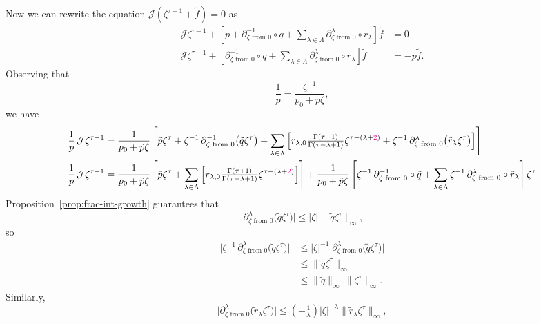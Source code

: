 \documentclass{article}
\theoremstyle{plain}
\begin{document}
Now we can rewrite the equation $\mathcal{J}(\zeta^{\tau-1} + \tilde{f}) = 0$ as
\begin{align*}
\mathcal{J} \zeta^{\tau-1} + \left[ p + \partial^{-1}_{\zeta \text{ from } 0} \circ q + \sum_{\lambda \in \Lambda} \partial^\lambda_{\zeta \text{ from } 0} \circ r_\lambda \right] \tilde{f} & = 0 \\
\mathcal{J} \zeta^{\tau-1} + \left[ \partial^{-1}_{\zeta \text{ from } 0} \circ q + \sum_{\lambda \in \Lambda} \partial^\lambda_{\zeta \text{ from } 0} \circ r_\lambda \right] \tilde{f} & = -p\tilde{f}.
\end{align*}
Observing that
\[ \frac{1}{p} = \frac{\zeta^{-1}}{p_0 + \tilde{p} \zeta}, \]
we have
\begin{align*}
\frac{1}{p}\,\mathcal{J} \zeta^{\tau-1} & = \frac{1}{p_0 + \tilde{p} \zeta} \left[ \tilde{p} \zeta^\tau + \zeta^{-1}\,\partial^{-1}_{\zeta \text{ from } 0}\big(\tilde{q} \zeta^\tau\big) + \sum_{\lambda \in \Lambda} \left[ r_{\lambda,0} \tfrac{\Gamma(\tau+1)}{\Gamma(\tau-\lambda+1)} \zeta^{\tau-(\lambda+\textcolor{magenta}{2})} + \zeta^{-1}\,\partial^\lambda_{\zeta \text{ from } 0} \big(\tilde{r}_\lambda \zeta^\tau\big) \right] \right] \\
\frac{1}{p}\,\mathcal{J} \zeta^{\tau-1} & = \frac{1}{p_0 + \tilde{p} \zeta} \left[ \tilde{p} \zeta^\tau + \sum_{\lambda \in \Lambda} \left[ r_{\lambda,0} \tfrac{\Gamma(\tau+1)}{\Gamma(\tau-\lambda+1)} \zeta^{\tau-(\lambda+\textcolor{magenta}{2})} \right] \right] + \frac{1}{p_0 + \tilde{p} \zeta} \left[ \zeta^{-1}\,\partial^{-1}_{\zeta \text{ from } 0} \circ \tilde{q} + \sum_{\lambda \in \Lambda} \zeta^{-1}\,\partial^\lambda_{\zeta \text{ from } 0} \circ \tilde{r}_\lambda \right] \zeta^\tau
\end{align*}
Proposition~\ref{prop:frac-int-growth} guarantees that
\[ \big|\partial^\lambda_{\zeta \text{ from } 0}\big(\tilde{q} \zeta^\tau\big)\big| \le |\zeta|\,\big\|\tilde{q} \zeta^\tau\big\|_\infty, \]
so
\begin{align*}
\big|\zeta^{-1}\,\partial^\lambda_{\zeta \text{ from } 0}\big(\tilde{q} \zeta^\tau\big)\big| & \le |\zeta|^{-1} \big|\partial^\lambda_{\zeta \text{ from } 0}\big(\tilde{q} \zeta^\tau\big)\big| \\
& \le \big\|\tilde{q} \zeta^\tau\big\|_\infty \\
& \le \|\tilde{q}\|_\infty\,\big\|\zeta^\tau\big\|_\infty.
\end{align*}
Similarly,
\[ \big|\partial^\lambda_{\zeta \text{ from } 0}\big(\tilde{r}_\lambda \zeta^\tau\big)\big| \le (-\tfrac{1}{\lambda}) |\zeta|^{-\lambda} \big\|\tilde{r}_\lambda \zeta^\tau\big\|_\infty, \]
\end{document}
